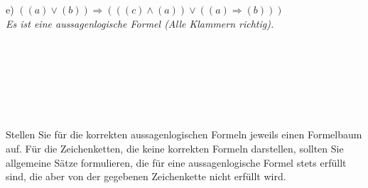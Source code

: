 e) $((a) \lor (b)) \Rightarrow (((c) \land (a)) \lor ((a) \Rightarrow (b)))$\\

\textit{Es ist eine aussagenlogische Formel (Alle Klammern richtig).}\\~\\~\\~\\~\\~\\~\\~\\

Stellen Sie für die korrekten aussagenlogischen Formeln jeweils einen Formelbaum auf. Für die
Zeichenketten, die keine korrekten Formeln darstellen, sollten Sie allgemeine Sätze formulieren, die für eine aussagenlogische Formel stets erfüllt sind, die aber von der gegebenen Zeichenkette nicht erfüllt wird.